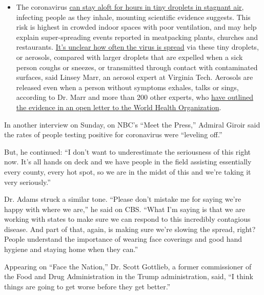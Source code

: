 \begin{itemize}
  \begin{itemize}
  \tightlist
  \item
    The coronavirus
    \href{https://www.nytimes.com/2020/07/04/health/239-experts-with-one-big-claim-the-coronavirus-is-airborne.html?action=click\&pgtype=Article\&state=default\&region=MAIN_CONTENT_3\&context=storylines_faq}{can
    stay aloft for hours in tiny droplets in stagnant air}, infecting
    people as they inhale, mounting scientific evidence suggests. This
    risk is highest in crowded indoor spaces with poor ventilation, and
    may help explain super-spreading events reported in meatpacking
    plants, churches and restaurants.
    \href{https://www.nytimes.com/2020/07/06/health/coronavirus-airborne-aerosols.html?action=click\&pgtype=Article\&state=default\&region=MAIN_CONTENT_3\&context=storylines_faq}{It's
    unclear how often the virus is spread} via these tiny droplets, or
    aerosols, compared with larger droplets that are expelled when a
    sick person coughs or sneezes, or transmitted through contact with
    contaminated surfaces, said Linsey Marr, an aerosol expert at
    Virginia Tech. Aerosols are released even when a person without
    symptoms exhales, talks or sings, according to Dr. Marr and more
    than 200 other experts, who
    \href{https://academic.oup.com/cid/article/doi/10.1093/cid/ciaa939/5867798}{have
    outlined the evidence in an open letter to the World Health
    Organization}.
  \end{itemize}
\end{itemize}

In another interview on Sunday, on NBC's ``Meet the Press,'' Admiral
Giroir said the rates of people testing positive for coronavirus were
``leveling off.''

But, he continued: ``I don't want to underestimate the seriousness of
this right now. It's all hands on deck and we have people in the field
assisting essentially every county, every hot spot, so we are in the
midst of this and we're taking it very seriously.''

Dr. Adams struck a similar tone. ``Please don't mistake me for saying
we're happy with where we are,'' he said on CBS. ``What I'm saying is
that we are working with states to make sure we can respond to this
incredibly contagious disease. And part of that, again, is making sure
we're slowing the spread, right? People understand the importance of
wearing face coverings and good hand hygiene and staying home when they
can.''

Appearing on ``Face the Nation,'' Dr. Scott Gottlieb, a former
commissioner of the Food and Drug Administration in the Trump
administration, said, ``I think things are going to get worse before
they get better.''

